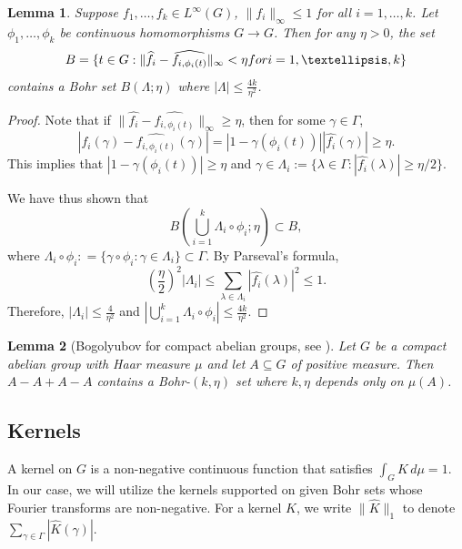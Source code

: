 \documentclass[10pt]{article}
\newtheorem{lemma}[lemma]{Lemma}
\theoremstyle{definition}
\begin{document}
\begin{lemma} \label{lem:translate}
Suppose $f_1, \ldots, f_k \in L^\infty(G)$, $\| f_i \|_{\infty} \leq 1$ for all $i=1, \ldots, k$. Let $\phi_1, \ldots, \phi_k$ be continuous homomorphisms $G \rightarrow G$. Then for any $\eta >0$, the set
\[
B = \{ t \in G: \| \widehat{f_i} - \widehat{f_{i, \phi_i(t)}} \|_{\infty} < \eta \textup{ for }i=1, \ldots, k \}
\]
contains a Bohr set $B(\Lambda; \eta)$ where $|\Lambda| \leq \frac{4k}{\eta^2}$.
\end{lemma}
\begin{proof}
Note that if $\| \widehat{f_i} - \widehat{f_{i, \phi_i(t)}} \|_\infty \geq \eta$, then for some $\gamma \in \Gamma$, 
\[
|\widehat{f_i}(\gamma) - \widehat{f_{i, \phi_i(t)}}(\gamma)| = |1 - \gamma(\phi_i(t))| |\widehat{f_i}(\gamma)| \geq \eta.
\]
This implies that $|1 - \gamma(\phi_i(t))| \geq \eta$ and $\gamma \in \Lambda_i := \{ \lambda \in \Gamma : |\widehat{f_i}(\lambda)| \geq \eta /2 \}$.

We have thus shown that 
\[
  B( \bigcup_{i=1}^k \Lambda_i \circ \phi_i; \eta) \subset B,  
\]
where $\Lambda_i \circ \phi_i: = \{ \gamma \circ \phi_i: \gamma \in \Lambda_i\} \subset \Gamma$. By  Parseval's formula, 
\[
\left( \frac{\eta}{2} \right)^2 |\Lambda_i| \leq \sum_{\lambda \in \Lambda_i} \left|\widehat{f_i}(\lambda)\right|^2 \leq 1.
\]
Therefore, $|\Lambda_i| \leq \frac{4}{\eta^2}$ and $|\bigcup_{i=1}^k \Lambda_i \circ \phi_i| \leq \frac{4k}{\eta^2}$.
\end{proof}

\setcounter{theorem}{2}
\begin{lemma}[Bogolyubov for compact abelian groups, see {\cite[Lemma 2.1]{ruzsa6}}]
\label{lem:bogolyubov_compact_group}
Let $G$ be a compact abelian group with Haar measure $\mu$ and let $A \subseteq G$ of positive measure. Then $A - A + A - A$ contains a Bohr-$(k, \eta)$ set where $k, \eta$ depends only on $\mu(A)$.
\end{lemma}

\subsection{Kernels}
A kernel on $G$ is a non-negative continuous function that satisfies $\int_G K \, d\mu =1$. In our case, we will utilize the kernels supported on given Bohr sets whose Fourier transforms are non-negative. For a kernel $K$, we write $\lVert \widehat{K} \rVert_1$ to denote $\sum_{\gamma \in \Gamma} | \widehat{K}(\gamma)|$.  
\end{document}
